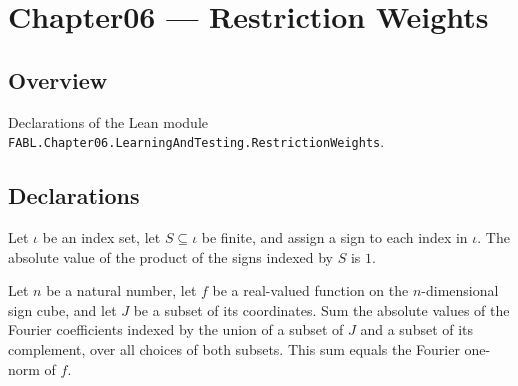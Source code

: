 \chapter{Chapter06 — Restriction Weights}
\section{Overview}

Declarations of the Lean module \texttt{FABL.Chapter06.LearningAndTesting.RestrictionWeights}.

\section{Declarations}

\begin{theorem}
\label{FABL.abs_indexedMonomial_eq_one}
\leanok
{}
Let $\iota$ be an index set, let $S\subseteq\iota$ be finite, and assign a sign to
each index in $\iota$. The absolute value of the product of the signs indexed by $S$ is
$1$.
\end{theorem}

\begin{theorem}
\label{FABL.sum_abs_split_fourierCoeff_eq_fourierOneNorm}
\leanok
{}
Let $n$ be a natural number, let $f$ be a real-valued function on the $n$-dimensional
sign cube, and let $J$ be a subset of its coordinates. Sum the absolute values of the
Fourier coefficients indexed by the union of a subset of $J$ and a subset of its
complement, over all choices of both subsets. This sum equals the Fourier one-norm of
$f$.
\end{theorem}

